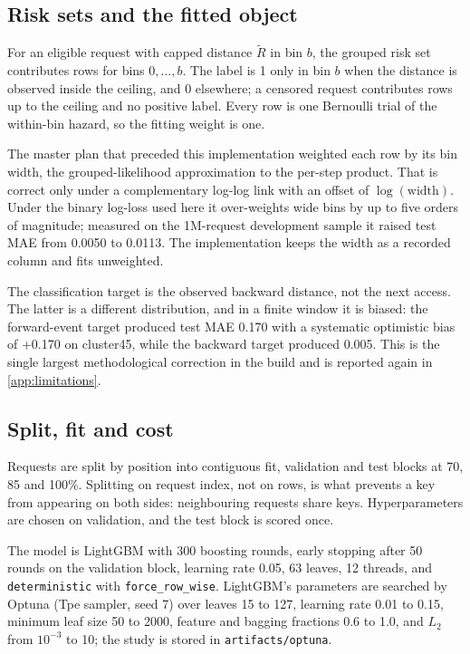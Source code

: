 \subsection{Risk sets and the fitted object}
\label{sec:riskset}

For an eligible request with capped distance $\tilde R$ in bin $b$, the grouped risk
set contributes rows for bins $0,\dots,b$. The label is 1 only in bin $b$ when the
distance is observed inside the ceiling, and 0 elsewhere; a censored request
contributes rows up to the ceiling and no positive label. Every row is one Bernoulli
trial of the within-bin hazard, so the fitting weight is one.

The master plan that preceded this implementation weighted each row by its bin
width, the grouped-likelihood approximation to the per-step product. That is correct
only under a complementary log-log link with an offset of $\log(\text{width})$.
Under the binary log-loss used here it over-weights wide bins by up to five orders
of magnitude; measured on the 1M-request development sample it raised test MAE from
0.0050 to 0.0113. The implementation keeps the width as a recorded column and fits
unweighted.

The classification target is the observed backward distance, not the next access.
The latter is a different distribution, and in a finite window it is biased: the
forward-event target produced test MAE 0.170 with a systematic optimistic bias of
+0.170 on cluster45, while the backward target produced 0.005. This is the single
largest methodological correction in the build and is reported again in
\cref{app:limitations}.

\subsection{Split, fit and cost}
\label{sec:fit}

Requests are split by position into contiguous fit, validation and test blocks at
70, 85 and 100\%. Splitting on request index, not on rows, is what prevents a key
from appearing on both sides: neighbouring requests share keys. Hyperparameters are
chosen on validation, and the test block is scored once.

The model is LightGBM with 300 boosting rounds, early stopping after 50 rounds on
the validation block, learning rate 0.05, 63 leaves, 12 threads, and
\texttt{deterministic} with \texttt{force\_row\_wise}. LightGBM's parameters are
searched by Optuna (Tpe sampler, seed 7) over leaves 15 to 127, learning rate 0.01
to 0.15, minimum leaf size 50 to 2000, feature and bagging fractions 0.6 to 1.0, and
$L_2$ from $10^{-3}$ to 10; the study is stored in \texttt{artifacts/optuna}.

